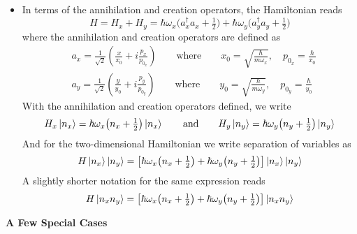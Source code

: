 \documentclass[11pt, a4paper]{article}
\newcommand{\eqtext}[1]{\qquad \text{#1} \qquad}
\begin{document}
\begin{itemize}
	\item In terms of the annihilation and creation operators, the Hamiltonian reads
	\begin{equation*}
		H = H_{x} + H_{y} = \hbar \omega_{x}\big(a_{x}^{\dagger}a_{x} + \tfrac{1}{2}\big) + \hbar \omega_{y}\big(a_{y}^{\dagger}a_{y} + \tfrac{1}{2}\big)
	\end{equation*}
	where the annihilation and creation operators are defined as
	\begin{align*}
		&a_{x} = \frac{1}{\sqrt{2}}\left(\frac{x}{x_{0}} + i \frac{p_{x}}{p_{0_{x}}}\right) \eqtext{where} x_{0} = \sqrt{\frac{\hbar}{m\omega_{x}}}, \quad p_{0_{x}} = \frac{\hbar}{x_{0}}\\
		&a_{y} = \frac{1}{\sqrt{2}}\left(\frac{y}{y_{0}} + i \frac{p_{y}}{p_{0_{y}}}\right) \eqtext{where} y_{0} = \sqrt{\frac{\hbar}{m\omega_{y}}}, \quad p_{0_{y}} = \frac{\hbar}{y_{0}}
	\end{align*}
	With the annihilation and creation operators defined, we write
	\begin{equation*}
		H_{x} \ket{n_{x}} = \hbar \omega_{x} \big(n_{x} + \tfrac{1}{2}\big) \ket{n_{x}} \eqtext{and} H_{y} \ket{n_{y}} = \hbar \omega_{y} \big(n_{y} + \tfrac{1}{2}\big) \ket{n_{y}}
	\end{equation*}
	And for the two-dimensional Hamiltonian we write separation of variables as
	\begin{equation*}
		H\ket{n_{x}} \ket{n_{y}} = \left[\hbar \omega_{x} \big(n_{x} + \tfrac{1}{2}\big) + \hbar \omega_{y} \big(n_{y} + \tfrac{1}{2}\big)\right] \ket{n_{x}} \ket{n_{y}}
	\end{equation*}
	A slightly shorter notation for the same expression reads
	\begin{equation*}
		H\ket{n_{x}n_{y}} = \left[\hbar \omega_{x} \big(n_{x} + \tfrac{1}{2}\big) + \hbar \omega_{y} \big(n_{y} + \tfrac{1}{2}\big)\right] \ket{n_{x}n_{y}}
	\end{equation*}
\end{itemize}	
	\textbf{A Few Special Cases}
\end{document}
